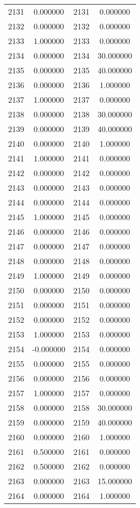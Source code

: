 \documentclass[12pt]{article}
\begin{document}
\begin{longtable}{@{}cccc@{}}
2131 & 0.000000 & 2131 & 0.000000 \\
2132 & 0.000000 & 2132 & 0.000000 \\
2133 & 1.000000 & 2133 & 0.000000 \\
2134 & 0.000000 & 2134 & 30.000000 \\
2135 & 0.000000 & 2135 & 40.000000 \\
2136 & 0.000000 & 2136 & 1.000000 \\
2137 & 1.000000 & 2137 & 0.000000 \\
2138 & 0.000000 & 2138 & 30.000000 \\
2139 & 0.000000 & 2139 & 40.000000 \\
2140 & 0.000000 & 2140 & 1.000000 \\
2141 & 1.000000 & 2141 & 0.000000 \\
2142 & 0.000000 & 2142 & 0.000000 \\
2143 & 0.000000 & 2143 & 0.000000 \\
2144 & 0.000000 & 2144 & 0.000000 \\
2145 & 1.000000 & 2145 & 0.000000 \\
2146 & 0.000000 & 2146 & 0.000000 \\
2147 & 0.000000 & 2147 & 0.000000 \\
2148 & 0.000000 & 2148 & 0.000000 \\
2149 & 1.000000 & 2149 & 0.000000 \\
2150 & 0.000000 & 2150 & 0.000000 \\
2151 & 0.000000 & 2151 & 0.000000 \\
2152 & 0.000000 & 2152 & 0.000000 \\
2153 & 1.000000 & 2153 & 0.000000 \\
2154 & -0.000000 & 2154 & 0.000000 \\
2155 & 0.000000 & 2155 & 0.000000 \\
2156 & 0.000000 & 2156 & 0.000000 \\
2157 & 1.000000 & 2157 & 0.000000 \\
2158 & 0.000000 & 2158 & 30.000000 \\
2159 & 0.000000 & 2159 & 40.000000 \\
2160 & 0.000000 & 2160 & 1.000000 \\
2161 & 0.500000 & 2161 & 0.000000 \\
2162 & 0.500000 & 2162 & 0.000000 \\
2163 & 0.000000 & 2163 & 15.000000 \\
2164 & 0.000000 & 2164 & 1.000000 \\

\end{longtable}
\end{document}
